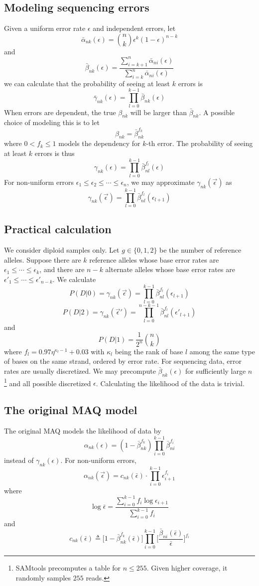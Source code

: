 \documentclass[pdftex,10pt]{book}
\begin{document}
\subsection{Modeling sequencing errors}
Given a uniform error rate $\epsilon$ and independent errors, let
$$
\bar{\alpha}_{nk}(\epsilon)=\binom{n}{k}\epsilon^k(1-\epsilon)^{n-k}
$$
and
$$
\bar{\beta}_{nk}(\epsilon)=\frac{\sum_{i=k+1}^n\bar{\alpha}_{ni}(\epsilon)}{\sum_{i=k}^n\bar{\alpha}_{ni}(\epsilon)}
$$
we can calculate that the probability of seeing at least $k$ errors is
$$
\bar{\gamma}_{nk}(\epsilon)=\prod_{l=0}^{k-1}\bar{\beta}_{nk}(\epsilon)
$$
When errors are dependent, the true $\beta_{nk}$ will be larger than
$\bar{\beta}_{nk}$. A possible choice of modeling this is to let
$$
\beta_{nk}=\bar{\beta}_{nk}^{f_k}
$$
where $0<f_k\le1$ models the dependency for $k$-th error. The
probability of seeing at least $k$ errors is thus
$$
\gamma_{nk}(\epsilon)=\prod_{l=0}^{k-1}\bar{\beta}^{f_l}_{nl}(\epsilon)
$$
For non-uniform errors $\epsilon_1\le\epsilon_2\le\cdots\le\epsilon_n$,
we may approximate $\gamma_{nk}(\vec{\epsilon})$ as
$$
\gamma_{nk}(\vec{\epsilon})=\prod_{l=0}^{k-1}\bar{\beta}^{f_l}_{nl}(\epsilon_{l+1})
$$

\subsection{Practical calculation}
We consider diploid samples only. Let $g\in\{0,1,2\}$ be the number of
reference alleles. Suppose there are $k$ reference alleles whose base
error rates are $\epsilon_1\le\cdots\le\epsilon_k$, and there are $n-k$
alternate alleles whose base error rates are
$\epsilon'_1\le\cdots\le\epsilon'_{n-k}$. We calculate
$$
P(D|0)=\gamma_{nk}(\vec\epsilon)=\prod_{l=0}^{k-1}\bar\beta_{nl}^{f_l}(\epsilon_{l+1})
$$
$$
P(D|2)=\gamma_{nk}(\vec\epsilon')=\prod_{l=0}^{n-k-1}\bar\beta_{nl}^{f_l}(\epsilon'_{l+1})
$$
and
$$
P(D|1)=\frac{1}{2^n}\binom{n}{k}
$$
where $f_l=0.97\eta^{\kappa_l-1}+0.03$ with $\kappa_l$ being the rank of base $l$
among the same type of bases on the same strand, ordered by error
rate. For sequencing data, error rates are usually discretized. We may
precompute $\bar\beta_{nk}(\epsilon)$ for sufficiently large
$n$\footnote{SAMtools precomputes a table for $n\le255$. Given higher
  coverage, it randomly samples $255$ reads.} and all possible
discretized $\epsilon$. Calculating the likelihood of the data is
trivial.

\subsection{The original MAQ model}
The original MAQ models the likelihood of data by
$$
\alpha_{nk}(\epsilon)=(1-\bar\beta^{f_k}_{nk})\prod_{i=0}^{k-1}\bar\beta^{f_i}_{ni}
$$
instead of $\gamma_{nk}(\epsilon)$. For non-uniform errors,
$$
\alpha_{nk}(\vec{\epsilon})=c_{nk}(\bar\epsilon)\cdot\prod_{i=0}^{k-1}\epsilon_{i+1}^{f_i}
$$
where
$$
\log{\bar\epsilon}=\frac{\sum_{i=0}^{k-1}f_i\log\epsilon_{i+1}}{\sum_{i=0}^{k-1}f_i}
$$
and
$$
c_{nk}(\bar\epsilon)\triangleq
\Big[1-\bar\beta^{f_k}_{nk}(\bar\epsilon)\Big]
\prod_{i=0}^{k-1}\Bigg[\frac{\bar\beta_{ni}(\bar\epsilon)}{\bar\epsilon}\Bigg]^{f_i}
$$
\end{document}
